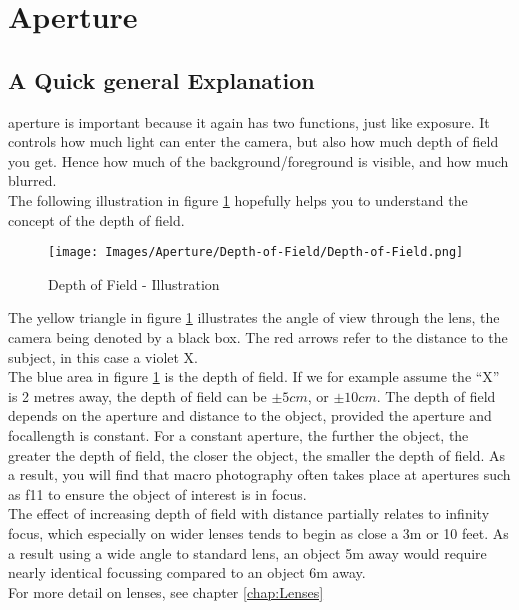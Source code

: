 \section{Aperture}
\label{sec:Aperture}

\subsection{A Quick general Explanation}

\Gls{aperture} is important because it again has two functions, just like \gls{exposure}. It controls how much light can enter the camera, but also how much depth of field you get. Hence how much of the background/foreground is visible, and how much blurred.
\\[\baselineskip]
The following illustration in figure \ref{fig:Depth-of-Field} hopefully helps you to understand the concept of the depth of field.

\begin{figure}[htbp]
	\centering
		\texttt{[image: Images/Aperture/Depth-of-Field/Depth-of-Field.png]}
	\caption{Depth of Field - Illustration}
	\label{fig:Depth-of-Field}
\end{figure}

The yellow triangle in figure \ref{fig:Depth-of-Field} illustrates the angle of view through the lens, the camera being denoted by a black box. The red arrows refer to the distance to the subject, in this case a violet X.
\\
The blue area in figure \ref{fig:Depth-of-Field} is the depth of field. If we for example assume the ``X'' is 2 metres away, the depth of field can be $\pm5cm$, or $\pm10cm$. The depth of field depends on the \gls{aperture} and distance to the object, provided the \gls{aperture} and \gls{focallength} is constant. For a constant \gls{aperture}, the further the object, the greater the depth of field, the closer the object, the smaller the depth of field. As a result, you will find that macro photography often takes place at \glspl{aperture} such as f11 to ensure the object of interest is in focus.
\\
The effect of increasing depth of field with distance partially relates to infinity focus, which especially on wider lenses tends to begin as close a 3m or 10 feet. As a result using a wide angle to standard lens, an object 5m away would require nearly identical focussing compared to an object 6m away.
\\
For more detail on lenses, see chapter \ref{chap:Lenses}

